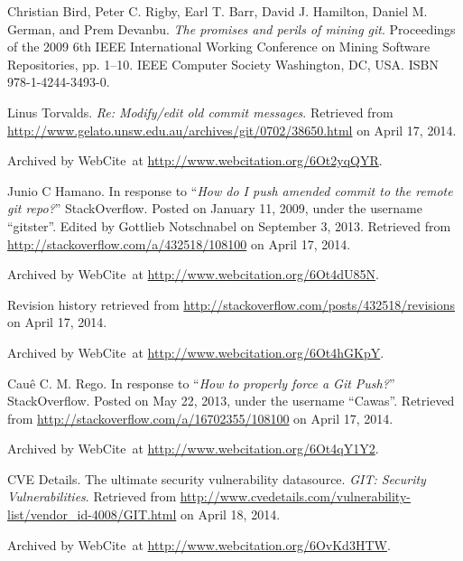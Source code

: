 \begin{thebibliography}{9}

Christian Bird, Peter C. Rigby, Earl T. Barr, David J. Hamilton, Daniel M.
German, and Prem Devanbu. \emph{The promises and perils of mining git}.
Proceedings of the 2009 6th IEEE International Working Conference on Mining
Software Repositories, pp. 1--10. IEEE Computer Society Washington, DC, USA.
ISBN 978-1-4244-3493-0.


Linus Torvalds. \emph{Re: Modify/edit old commit messages}. Retrieved from
\url{http://www.gelato.unsw.edu.au/archives/git/0702/38650.html} on April 17,
2014.

Archived by WebCite\textsuperscript{\textregistered}\ at
\url{http://www.webcitation.org/6Ot2yqQYR}.


Junio C Hamano. In response to ``\emph{How do I push amended commit to the remote
git repo?}'' StackOverflow. Posted on January 11, 2009, under the username
``gitster''. Edited by Gottlieb Notschnabel on September 3, 2013. Retrieved
from \url{http://stackoverflow.com/a/432518/108100} on April 17, 2014.

Archived by WebCite\textsuperscript{\textregistered}\ at
\url{http://www.webcitation.org/6Ot4dU85N}.

Revision history retrieved from
\url{http://stackoverflow.com/posts/432518/revisions} on April 17, 2014.

Archived by WebCite\textsuperscript{\textregistered}\ at
\url{http://www.webcitation.org/6Ot4hGKpY}.


Cauê C. M. Rego. In response to ``\emph{How to properly force a Git Push?}''
StackOverflow. Posted on May 22, 2013, under the username ``Cawas''.  Retrieved
from \url{http://stackoverflow.com/a/16702355/108100} on April 17, 2014.

Archived by WebCite\textsuperscript{\textregistered}\ at
\url{http://www.webcitation.org/6Ot4qY1Y2}.


CVE Details. The ultimate security vulnerability datasource. \emph{GIT:
Security Vulnerabilities}. Retrieved from
\url{http://www.cvedetails.com/vulnerability-list/vendor_id-4008/GIT.html} on
April 18, 2014.

Archived by WebCite\textsuperscript{\textregistered}\ at
\url{http://www.webcitation.org/6OvKd3HTW}.


\end{thebibliography}
